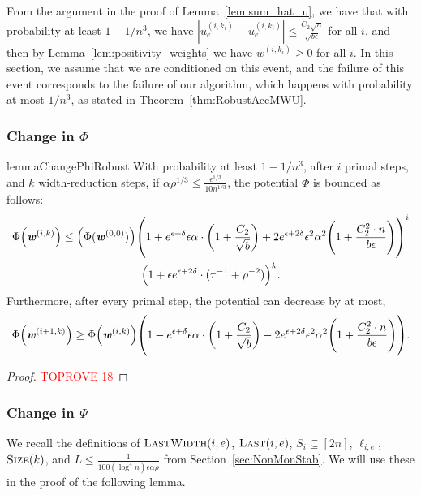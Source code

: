 \documentclass[11pt]{article}
\let\originalleft\left
\let\originalright\right
\renewcommand{\left}{\mathopen{}\mathclose\bgroup\originalleft}
\renewcommand{\right}{\aftergroup\egroup\originalright}
\newcommand\uu{\boldsymbol{\mathit{u}}}
\newcommand\ww{\boldsymbol{\mathit{w}}}
\newcommand{\wh}{\widehat}
\begin{document}
From the argument in the proof of Lemma~\ref{lem:sum_hat_u}, we have that with probability at least $1-1/n^3$, we have $|\wh{\uu}_e^{(i,k_i)} - \uu_e^{(i,k_i)}| \leq \frac{C_2 \sqrt{n}}{\sqrt{b \epsilon}}$ for all $i$, and then by Lemma~\ref{lem:positivity_weights} we have $\ww^{(i,k_i)} \geq 0$ for all $i$. In this section, we assume that we are conditioned on this event, and the failure of this event corresponds to the failure of our algorithm, which happens with probability at most $1/n^3$, as stated in Theorem~\ref{thm:RobustAccMWU}.

\subsubsection*{Change in $\Phi$}
\begin{restatable}{lemma}{ChangePhiRobust}
  \label{lem:ChangePhiRobust}
  With probability at least $1-1/n^3$, after $i$ primal steps, and $k$ width-reduction steps, if $\alpha \rho^{1/3}\leq \frac{\epsilon^{1/3}}{10 n^{1/3}}$,
  the potential $\Phi$ is bounded as follows:
  \begin{multline*}
\Phi\left(\ww^{(i,k)}\right) \leq \left(\Phi(\ww^{(0,0)})\right)\left( 1 + e^{\epsilon+\delta}\epsilon \alpha  \cdot \left(1 + \frac{C_2}{\sqrt{b}}\right) + 2e^{\epsilon+2\delta} \epsilon^2 \alpha^2 \left(1 + \frac{C_2^2 \cdot n}{b \epsilon}\right) \right)^i\\ \left( 1 + \epsilon e^{\epsilon+2\delta} \cdot (\tau^{-1} + \rho^{-2}) \right)^k.
 \end{multline*}
 Furthermore, after every primal step, the potential can decrease by at most,
 \[
 \Phi\left(\ww^{(i+1,k)}\right) \geq  \Phi\left(\ww^{(i,k)}\right)\left( 1 - e^{\epsilon+\delta}\epsilon \alpha  \cdot \left(1 + \frac{C_2}{\sqrt{b}}\right) - 2e^{\epsilon+2\delta} \epsilon^2 \alpha^2 \left(1 + \frac{C_2^2 \cdot n}{b \epsilon}\right) \right).  
 \]
\end{restatable}
\begin{proof}\textcolor{red}{TOPROVE 18}\end{proof}


\subsubsection*{Change in $\Psi$}
We recall the definitions of $\textsc{LastWidth}(i,e)$, $\textsc{Last}(i,e)$, $S_i \subseteq [2n]$, $\ell_{i,e}$, $\textsc{Size}(k)$, and $L \leq \frac{1}{100 (\log^4 n) \epsilon \alpha \rho}$ from Section~\ref{sec:NonMonStab}. We will use these in the proof of the following lemma. 
\end{document}

